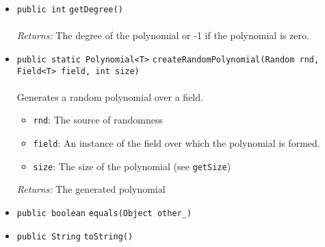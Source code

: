 \begin{itemize}
\item \lstinline|public int| \lstinline|getDegree|\lstinline|()|\\ \\[-0.6em]
\emph{Returns:} The degree of the polynomial or -1 if the polynomial is zero.



\item \lstinline|public static Polynomial<T>| \lstinline|createRandomPolynomial|\lstinline|(Random rnd, Field<T> field, int size)|\\ \\[-0.6em]
Generates a random polynomial over a field.
\begin{itemize}
\item \lstinline|rnd|: The source of randomness
\item \lstinline|field|: An instance of the field over which the polynomial is formed.
\item \lstinline|size|: The size of the polynomial (see \lstinline|getSize|)
\end{itemize}

\emph{Returns:} The generated polynomial

\item \lstinline|public boolean| \lstinline|equals|\lstinline|(Object other_)| \\[-0.6em]




\item \lstinline|public String| \lstinline|toString|\lstinline|()| \\[-0.6em]




\end{itemize}

